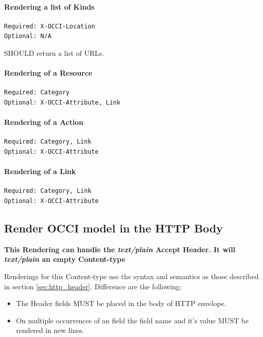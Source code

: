 \documentclass[10pt,a4paper]{article}
\begin{document}
\paragraph{Rendering a list of Kinds}
\begin{verbatim}
Required: X-OCCI-Location
Optional: N/A
\end{verbatim}
SHOULD return a list of URLs.

\paragraph{Rendering of a Resource}
\begin{verbatim}
Required: Category
Optional: X-OCCI-Attribute, Link
\end{verbatim}

\paragraph{Rendering of a Action}
\begin{verbatim}
Required: Category, Link
Optional: X-OCCI-Attribute
\end{verbatim}

\paragraph{Rendering of a Link}
\begin{verbatim}
Required: Category, Link
Optional: X-OCCI-Attribute
\end{verbatim}

\subsection{Render OCCI model in the HTTP Body}
\label{sec:http_body}

\textbf{This Rendering can handle the \textit{text/plain} Accept Header. It will \textit{text/plain} an empty Content-type}

Renderings for this Content-type use the syntax and semantics as those described in section \ref{sec:http_header}. Difference are the following:

\begin{itemize}
  \item The Header fields MUST be placed in the body of HTTP envelope.
  \item On multiple occurrences of an field the field name and it's value MUST be rendered in new lines.
\end{itemize}
\end{document}
